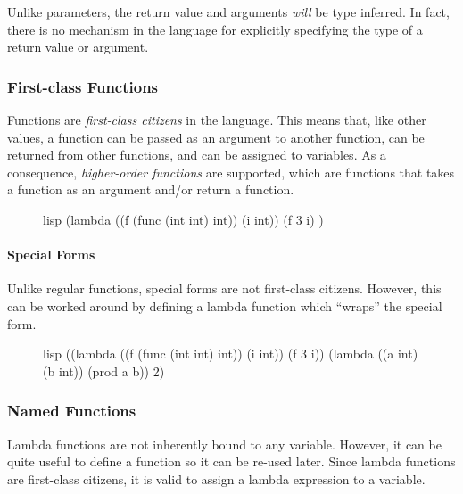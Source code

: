 Unlike parameters, the return value and arguments \textit{will} be type inferred. In fact, there is no mechanism in the language for explicitly specifying the type of a return value or argument.

\subsubsection{First-class Functions}
Functions are \textit{first-class citizens} in the language. This means that, like other values, a function can be passed as an argument to another function, can be returned from other functions, and can be assigned to variables. As a consequence, \textit{higher-order functions} are supported, which are functions that takes a function as an argument and/or return a function.

\begin{figure}[htp]
    \centering
    \begin{cminted}[autogobble=true]{lisp}
        (lambda ((f (func (int int) int))
                 (i int))
          (f 3 i)
        )
    \end{cminted}
    \captionsetup[figure]{font=small}
\end{figure}

\paragraph{Special Forms}
Unlike regular functions, special forms are not first-class citizens. However, this can be worked around by defining a lambda function which ``wraps'' the special form.

\begin{figure}[htp]
    \centering
    \begin{cminted}[autogobble=true]{lisp}
        ((lambda ((f (func (int int) int))
                 (i int))
          (f 3 i))
        (lambda ((a int) (b int)) (prod a b)) 2)
    \end{cminted}
    \captionsetup[figure]{font=small}
\end{figure}

\subsubsection{Named Functions}
Lambda functions are not inherently bound to any variable. However, it can be quite useful to define a function so it can be re-used later. Since lambda functions are first-class citizens, it is valid to assign a lambda expression to a variable.

